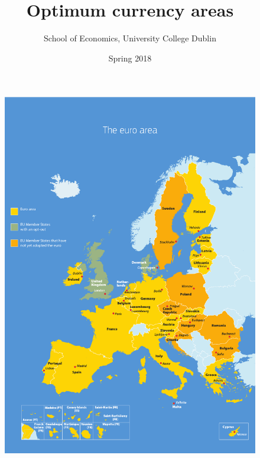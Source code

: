 \documentclass{beamer}
\title{Optimum currency areas}
\author{School of Economics, University College Dublin}
\date{Spring 2018}
\begin{document}
\begin{frame}
 \titlepage
\end{frame}

\begin{frame}
  \begin{figure}
    \includegraphics[scale=.3]{eurozone.eps}
  \end{figure}
\end{frame}
\end{document}
